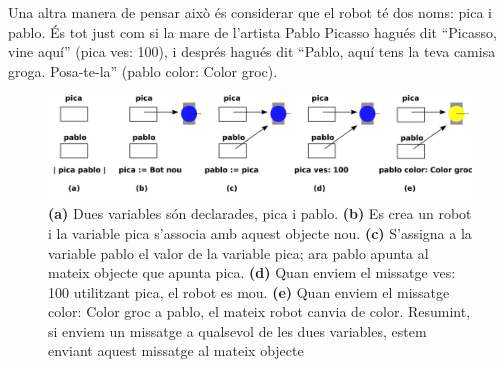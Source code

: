 Una altra manera de pensar això és considerar que el robot té dos noms: \textsf{pica} i \textsf{pablo}. És tot just com si la mare de l'artista Pablo Picasso hagués dit ``Picasso, vine aquí'' (\textsf{pica ves: 100}), i després hagués dit ``Pablo, aquí tens la teva camisa groga. Posa-te-la'' (\textsf{pablo color: Color groc}).
\begin{figure}[h]
\begin{center}
\includegraphics[scale=0.225]{Imatges/figura9-1.pdf}
\end{center}
\caption{
\textbf{\upshape (a)} Dues variables són declarades, \textsf{\upshape pica} i \textsf{\upshape pablo}.
\textbf{\upshape (b)} Es crea un robot i la variable \textsf{\upshape pica} s'associa amb aquest objecte nou.
\textbf{\upshape (c)} S'assigna a la variable \textsf{\upshape pablo} el valor de la variable \textsf{\upshape pica}; ara \textsf{\upshape pablo} apunta al mateix objecte que apunta \textsf{\upshape pica}.
\textbf{\upshape (d)} Quan enviem el missatge \textsf{\upshape ves: 100} utilitzant \textsf{\upshape pica}, el robot es mou.
\textbf{\upshape (e)} Quan enviem el missatge \textsf{\upshape color: Color groc} a \textsf{\upshape pablo}, el mateix robot canvia de color.
Resumint, si enviem un missatge a qualsevol de les dues variables, estem enviant aquest missatge al mateix objecte
}
\label{fig0901}
\end{figure}

\vspace*{5mm}

